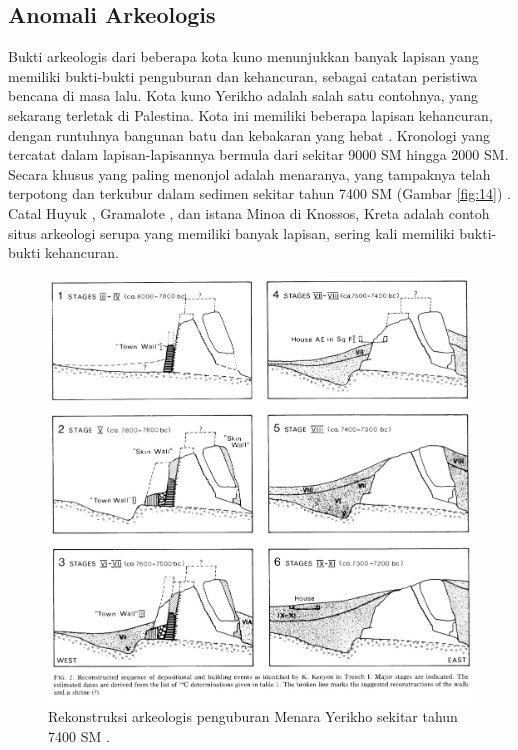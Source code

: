 \documentclass[10pt,twocolumn,letterpaper]{article}
\begin{document}
\subsection{Anomali Arkeologis}

Bukti arkeologis dari beberapa kota kuno menunjukkan banyak lapisan yang memiliki bukti-bukti penguburan dan kehancuran, sebagai catatan peristiwa bencana di masa lalu. Kota kuno Yerikho adalah salah satu contohnya, yang sekarang terletak di Palestina. Kota ini memiliki beberapa lapisan kehancuran, dengan runtuhnya bangunan batu dan kebakaran yang hebat \cite{96,97}. Kronologi yang tercatat dalam lapisan-lapisannya bermula dari sekitar 9000 SM hingga 2000 SM. Secara khusus yang paling menonjol adalah menaranya, yang tampaknya telah terpotong dan terkubur dalam sedimen sekitar tahun 7400 SM (Gambar \ref{fig:14}) \cite{95}. Catal Huyuk \cite{99}, Gramalote \cite{98}, dan istana Minoa di Knossos, Kreta \cite{100,101} adalah contoh situs arkeologi serupa yang memiliki banyak lapisan, sering kali memiliki bukti-bukti kehancuran.

\begin{figure}[t]
\begin{center}
   \includegraphics[width=1\linewidth]{jericho.jpg}
\end{center}
   \caption{Rekonstruksi arkeologis penguburan Menara Yerikho sekitar tahun 7400 SM \cite{95}.}
\label{fig:14}
\label{fig:onecol}
\end{figure}
\end{document}
